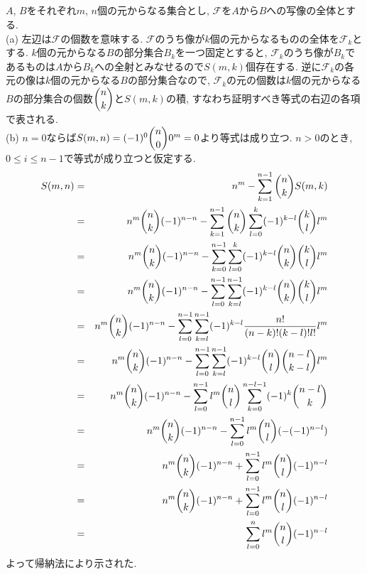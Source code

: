 \documentclass{jsarticle}
\begin{document}
\subsection{} %
$A$, $B$をそれぞれ$m$, $n$個の元からなる集合とし, $\mathscr{F}$を$A$から$B$への写像の全体とする.\\
(a) 左辺は$\mathscr{F}$の個数を意味する. $\mathscr{F}$のうち像が$k$個の元からなるものの全体を$\mathscr{F}_k$とする. $k$個の元からなる$B$の部分集合$B_k$を一つ固定とすると, $\mathscr{F}_k$のうち像が$B_k$であるものは$A$から$B_k$への全射とみなせるので$S(m, k)$個存在する. 逆に$\mathscr{F}_k$の各元の像は$k$個の元からなる$B$の部分集合なので, $\mathscr{F}_k$の元の個数は$k$個の元からなる$B$の部分集合の個数$\dbinom{n}{k}$と$S(m, k)$の積, すなわち証明すべき等式の右辺の各項で表される.\\
(b) $n = 0$ならば$S(m, n) = (-1)^0\dbinom{n}{0}0^m = 0$より等式は成り立つ. $n > 0$のとき, $0 \leq i \leq n - 1$で等式が成り立つと仮定する.
\begin{eqnarray*}
	S(m, n)
	&=& n^m - \sum_{k = 1}^{n - 1}\dbinom{n}{k}S(m, k)\\
	&=& n^m\binom{n}{k}(-1)^{n - n} - \sum_{k = 1}^{n - 1}\dbinom{n}{k}\sum_{l = 0}^{k}(-1)^{k - l}\dbinom{k}{l}l^m\\
	&=& n^m\binom{n}{k}(-1)^{n - n} - \sum_{k = 0}^{n - 1}\sum_{l = 0}^{k}(-1)^{k - l}\dbinom{n}{k}\dbinom{k}{l}l^m\\
	&=& n^m\binom{n}{k}(-1)^{n - n} - \sum_{l = 0}^{n - 1}\sum_{k = l}^{n - 1}(-1)^{k - l}\dbinom{n}{k}\dbinom{k}{l}l^m\\
	&=& n^m\binom{n}{k}(-1)^{n - n} - \sum_{l = 0}^{n - 1}\sum_{k = l}^{n - 1}(-1)^{k - l}\dfrac{n!}{(n - k)!(k - l)!l!}l^m\\
	&=& n^m\binom{n}{k}(-1)^{n - n} - \sum_{l = 0}^{n - 1}\sum_{k = l}^{n - 1}(-1)^{k - l}\dbinom{n}{l}\dbinom{n - l}{k - l}l^m\\
	&=& n^m\binom{n}{k}(-1)^{n - n} - \sum_{l = 0}^{n - 1}l^m\dbinom{n}{l}\sum_{k = 0}^{n - l - 1}(-1)^{k}\dbinom{n - l}{k}\\
	&=& n^m\binom{n}{k}(-1)^{n - n} - \sum_{l = 0}^{n - 1}l^m\dbinom{n}{l}(-(-1)^{n - l})\\
	&=& n^m\binom{n}{k}(-1)^{n - n} + \sum_{l = 0}^{n - 1}l^m\dbinom{n}{l}(-1)^{n - l}\\
	&=& n^m\binom{n}{k}(-1)^{n - n} + \sum_{l = 0}^{n - 1}l^m\dbinom{n}{l}(-1)^{n - l}\\
	&=& \sum_{l = 0}^{n}l^m\dbinom{n}{l}(-1)^{n - l}
\end{eqnarray*}
よって帰納法により示された.
\end{document}
